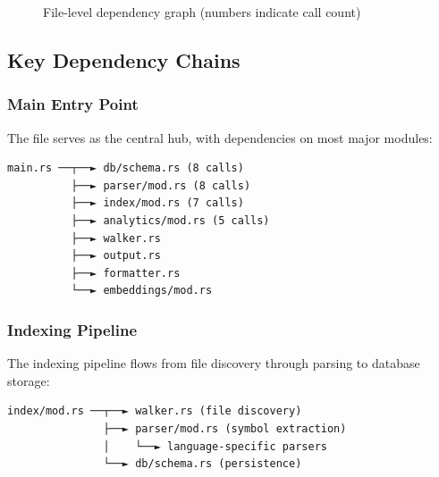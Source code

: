\begin{figure}[h]
\caption{File-level dependency graph (numbers indicate call count)}
\label{fig:dependencies}
\end{figure}

\subsection{Key Dependency Chains}

\subsubsection{Main Entry Point}

The  file serves as the central hub, with dependencies on most major modules:

\begin{verbatim}
main.rs ──┬──► db/schema.rs (8 calls)
          ├──► parser/mod.rs (8 calls)
          ├──► index/mod.rs (7 calls)
          ├──► analytics/mod.rs (5 calls)
          ├──► walker.rs
          ├──► output.rs
          ├──► formatter.rs
          └──► embeddings/mod.rs
\end{verbatim}

\subsubsection{Indexing Pipeline}

The indexing pipeline flows from file discovery through parsing to database storage:

\begin{verbatim}
index/mod.rs ──┬──► walker.rs (file discovery)
               ├──► parser/mod.rs (symbol extraction)
               │    └──► language-specific parsers
               └──► db/schema.rs (persistence)
\end{verbatim}

